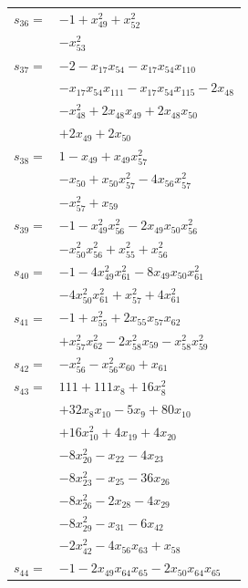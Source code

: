 \begin{longtable}{@{}r@{\;}l@{}}
\(s_{36}=\) & \(\displaystyle -1 +x_{49}^{2} +x_{52}^{2}\) \\
 & \(\displaystyle -x_{53}^{2}\) \\[3pt]
\(s_{37}=\) & \(\displaystyle -2 -x_{17}x_{54} -x_{17}x_{54}x_{110}\) \\
 & \(\displaystyle -x_{17}x_{54}x_{111} -x_{17}x_{54}x_{115} -2x_{48}\) \\
 & \(\displaystyle -x_{48}^{2} +2x_{48}x_{49} +2x_{48}x_{50}\) \\
 & \(\displaystyle +2x_{49} +2x_{50}\) \\[3pt]
\(s_{38}=\) & \(\displaystyle 1 -x_{49} +x_{49}x_{57}^{2}\) \\
 & \(\displaystyle -x_{50} +x_{50}x_{57}^{2} -4x_{56}x_{57}^{2}\) \\
 & \(\displaystyle -x_{57}^{2} +x_{59}\) \\[3pt]
\(s_{39}=\) & \(\displaystyle -1 -x_{49}^{2}x_{56}^{2} -2x_{49}x_{50}x_{56}^{2}\) \\
 & \(\displaystyle -x_{50}^{2}x_{56}^{2} +x_{55}^{2} +x_{56}^{2}\) \\[3pt]
\(s_{40}=\) & \(\displaystyle -1 -4x_{49}^{2}x_{61}^{2} -8x_{49}x_{50}x_{61}^{2}\) \\
 & \(\displaystyle -4x_{50}^{2}x_{61}^{2} +x_{57}^{2} +4x_{61}^{2}\) \\[3pt]
\(s_{41}=\) & \(\displaystyle -1 +x_{55}^{2} +2x_{55}x_{57}x_{62}\) \\
 & \(\displaystyle +x_{57}^{2}x_{62}^{2} -2x_{58}^{2}x_{59} -x_{58}^{2}x_{59}^{2}\) \\[3pt]
\(s_{42}=\) & \(\displaystyle -x_{56}^{2} -x_{56}^{2}x_{60} +x_{61}\) \\[3pt]
\(s_{43}=\) & \(\displaystyle 111 +111x_{8} +16x_{8}^{2}\) \\
 & \(\displaystyle +32x_{8}x_{10} -5x_{9} +80x_{10}\) \\
 & \(\displaystyle +16x_{10}^{2} +4x_{19} +4x_{20}\) \\
 & \(\displaystyle -8x_{20}^{2} -x_{22} -4x_{23}\) \\
 & \(\displaystyle -8x_{23}^{2} -x_{25} -36x_{26}\) \\
 & \(\displaystyle -8x_{26}^{2} -2x_{28} -4x_{29}\) \\
 & \(\displaystyle -8x_{29}^{2} -x_{31} -6x_{42}\) \\
 & \(\displaystyle -2x_{42}^{2} -4x_{56}x_{63} +x_{58}\) \\[3pt]
\(s_{44}=\) & \(\displaystyle -1 -2x_{49}x_{64}x_{65} -2x_{50}x_{64}x_{65}\) \\

\end{longtable}

